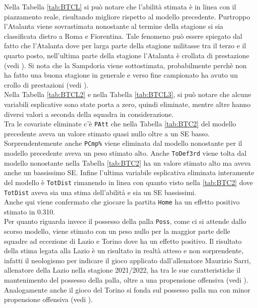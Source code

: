 Nella Tabella \ref{tab:BTCL} si può notare che l'abilità stimata è in linea con il piazzamento reale, risultando migliore rispetto al modello precedente. Purtroppo l'Atalanta viene sovrastimata nonostante al termine della stagione si sia classificata dietro a Roma e Fiorentina. Tale fenomeno può essere spiegato dal fatto che l'Atalanta dove per larga parte della stagione militasse tra il terzo e il quarto posto, nell'ultima parte della stagione l'Atalanta è crollata di prestazione (vedi \textit{\cite{site:storyAta}}). Si nota che la Sampdoria viene sottostimata, probabilmente perchè non ha fatto una buona stagione in generale e verso fine campionato ha avuto un crollo di prestazioni (vedi \textit{\cite{site:storySamp}}).\\

Nella Tabella \ref{tab:BTCL2} e nella Tabella \ref{tab:BTCL3}, si può notare che alcune variabili esplicative sono state porta a zero, quindi eliminate, mentre altre hanno diversi valori a seconda della squadra in considerazione. \\
Tra le covariate eliminate c'è \texttt{PAtt} che nella Tabella \ref{tab:BTC2} del modello precedente aveva un valore stimato quasi nullo oltre a un SE basso. Sorprendentemente anche \texttt{PCmp\%} viene eliminata dal modello nonostante per il modello precedente aveva un peso stimato alto. Anche \texttt{ToDef3rd} viene tolta dal modello nonostante nella Tabella \ref{tab:BTC2} ha un valore stimato alto ma aveva anche un bassissimo SE. Infine l'ultima variabile esplicativa eliminata interamente del modello è \texttt{TotDist} rimanendo in linea con quanto visto nella \ref{tab:BTC2} dove \texttt{TotDist} aveva sia una stima dell'abilità e sia un SE bassissimi.\\
Anche qui viene confermato che giocare la partita \texttt{Home} ha un effetto positivo stimato in 0.310.\\
Per quanto riguarda invece il possesso della palla \texttt{Poss}, come ci si attende dallo scorso modello, viene stimato con un peso nullo per la maggior parte delle squadre ad eccezione di Lazio e Torino dove ha un effetto positivo. Il risultato della stima legata alla Lazio è un risultato in realtà atteso e non sorprendente, infatti il \textit{\cite{site:sarrismotr}} neologismo per indicare il gioco applicato dall'allenatore Maurizio Sarri, allenatore della Lazio nella stagione 2021/2022, ha tra le sue caratteristiche il mantenimento del possesso della palla, oltre a una propensione offensiva (vedi \textit{\cite{site:sarrismo}}). Analogamente anche il gioco del Torino si fonda sul possesso palla ma con minor propensione offensiva (vedi \textit{\cite{site:torino}}).\\
